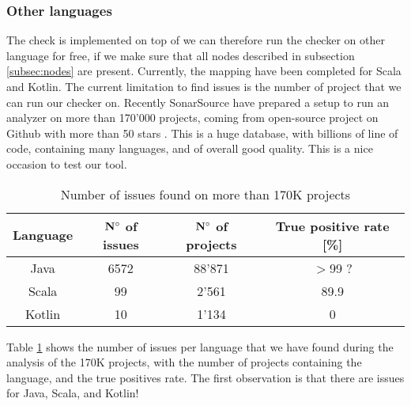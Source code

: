 \subsubsection{Other languages}
\label{subsubsec:other_languages}
The check is implemented on top of \slang{} we can therefore run the checker on other language for free, if we make sure that all nodes described in subsection \ref{subsec:nodes} are present. 
Currently, the mapping have been completed for Scala and Kotlin.
The current limitation to find issues is the number of project that we can run our checker on.
Recently SonarSource have prepared a setup to run an analyzer on more than 170'000 projects, coming from open-source project on Github with more than 50 stars \cite{sourced:2019:Online}. 
This is a huge database, with billions of line of code, containing many languages, and of overall good quality. 
This is a nice occasion to test our tool.

\begin{table}[h]
	\centering
	\caption{Number of issues found on more than 170K projects}
	\label{table:large_scale_issues}
	\begin{tabular}{|c|c|c|c|}
		\hline
		\bf Language & \bf $\bf N^{\circ}$ of issues & \bf $\bf N^{\circ}$  of projects & \bf True positive rate [\%] \\ \hline
		Java & 6572 & 88'871 & $>$99 ? \\
		Scala & 99 & 2'561 & 89.9 \\
		Kotlin & 10 & 1'134 & 0 \\ \hline
	\end{tabular}
\end{table}

Table \ref{table:large_scale_issues} shows the number of issues per language that we have found during the analysis of the 170K projects, with the number of projects containing the language, and the true positives rate.
The first observation is that there are issues for Java, Scala, and Kotlin!

